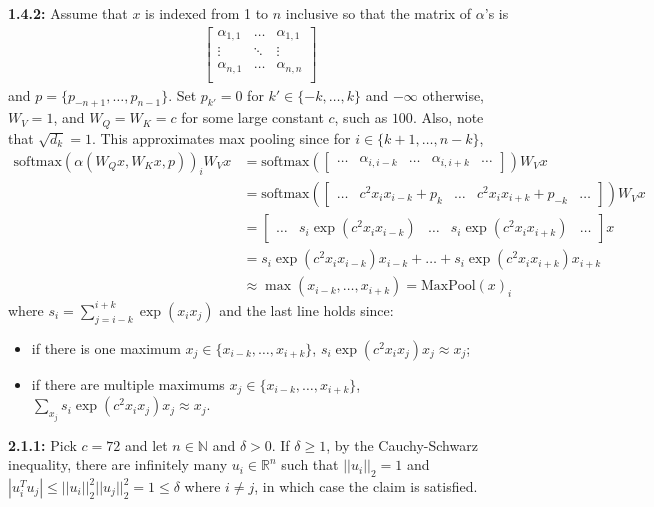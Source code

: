 \documentclass[12pt]{article}
\begin{document}
\textbf{1.4.2:} Assume that $x$ is indexed from 1 to $n$ inclusive so that the matrix of $\alpha$'s is \begin{align*} \begin{bmatrix}
    \alpha_{1,1} & \ldots & \alpha_{1,1}\\
    \vdots & \ddots & \vdots\\
    \alpha_{n,1} & \ldots & \alpha_{n,n}\\
\end{bmatrix} \end{align*} and $p = \{p_{-n+1},\ldots,p_{n-1}\}$. Set $p_{k'} = 0$ for $k' \in \{-k,\ldots,k\}$ and $-\infty$ otherwise, $W_V = 1$, and $W_Q = W_K = c$ for some large constant $c$, such as $100$. Also, note that $\sqrt{d_k} = 1$. This approximates max pooling since for $i \in \{k+1,\ldots,n-k\}$, \begin{align*}
    \text{softmax}(\alpha(W_Qx,W_Kx,p))_i W_Vx &= \text{softmax} (\begin{bmatrix} \ldots & \alpha_{i,i-k} & \ldots & \alpha_{i,i+k} & \ldots \end{bmatrix}) W_Vx \\
    &= \text{softmax} (\begin{bmatrix} \ldots & c^2 x_i x_{i-k} + p_k & \ldots & c^2 x_i x_{i+k} + p_{-k} & \ldots \end{bmatrix}) W_Vx\\
    &= \begin{bmatrix} \ldots & s_i \exp(c^2 x_i x_{i-k}) & \ldots & s_i \exp(c^2 x_i x_{i+k}) & \ldots \end{bmatrix} x\\
    &= s_i \exp(c^2 x_i x_{i-k})x_{i-k} + \ldots + s_i \exp(c^2 x_i x_{i+k})x_{i+k}\\
    &\approx \max(x_{i-k},\ldots,x_{i+k}) = \text{MaxPool}(x)_i
\end{align*} where $s_i = \sum_{j=i-k}^{i+k} \exp(x_i x_j)$ and the last line holds since:
\begin{itemize}
    \item if there is one maximum $x_j \in \{x_{i-k},\ldots,x_{i+k}\}$, $s_i\exp(c^2 x_i x_j)x_j \approx x_j$;
    \item if there are multiple maximums $x_j \in \{x_{i-k},\ldots,x_{i+k}\}$, $\sum_{x_j} s_i\exp(c^2 x_i x_j)x_j \approx x_j$.
\end{itemize}

\textbf{2.1.1:} Pick $c = 72$ and let $n \in \mathbb{N}$ and $\delta > 0$. If $\delta \geq 1$, by the Cauchy-Schwarz inequality, there are infinitely many $u_i \in \mathbb{R}^n$ such that $||u_i||_2 = 1$ and $|u_i^T u_j| \leq ||u_i||_2^2 ||u_j||_2^2 = 1 \leq \delta$ where $i\neq j$, in which case the claim is satisfied.
\end{document}
